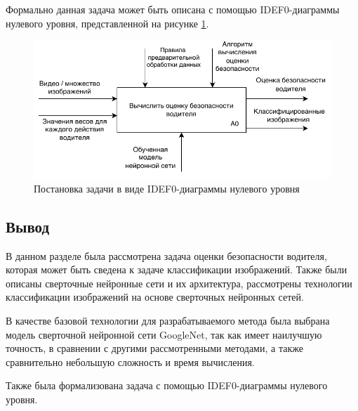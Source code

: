 Формально данная задача может быть описана с помощью IDEF0-диаграммы нулевого уровня, представленной на рисунке \ref{fig:idef0}.
 \begin{figure}[hbtp]
	\centering
	\includegraphics[width=\textwidth]{img/idef0.pdf}
	\caption{Постановка задачи в виде IDEF0-диаграммы нулевого уровня}
	\label{fig:idef0}
\end{figure}
\clearpage

\subsection*{Вывод}
В данном разделе была рассмотрена задача оценки безопасности водителя, которая может быть сведена к задаче классификации изображений. Также были описаны сверточные нейронные сети и их архитектура, рассмотрены технологии классификации изображений на основе сверточных нейронных сетей.

В качестве базовой технологии для разрабатываемого метода была выбрана модель сверточной нейронной сети GoogleNet, так как имеет наилучшую точность, в сравнении с другими рассмотренными методами, а также сравнительно небольшую сложность и время вычисления.

Также была формализована задача с помощью  IDEF0-диаграммы нулевого уровня.

\pagebreak